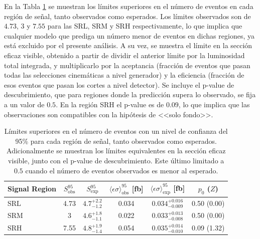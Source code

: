 En la Tabla \ref{tab:model_indep_ul} se muestran los límites superiores en el número de eventos en cada región de señal, tanto observados como esperados. Los límites observados son de $4.73$, $3$ y $7.55$ para las SRL, SRM y SRH respectivamente, lo que implica que cualquier modelo que prediga un número menor de eventos en dichas regiones, ya está excluido por el presente análisis. A su vez, se muestra el límite en la sección eficaz visible, obtenido a partir de dividir el anterior límite por la luminosidad total integrada, y multiplicarlo por la aceptancia (fracción de eventos que pasan todas las selecciones cinemáticas a nivel generador) y la eficiencia (fracción de esos eventos que pasan los cortes a nivel detector). 
Se incluye el p-value de descubrimiento, que para regiones donde la predicción supera lo observado, se fija a un valor de $0.5$. En la región SRH el p-value es de $0.09$, lo que implica que las observaciones son compatibles con la hipótesis de <<solo fondo>>.


\begin{table}[!h]
  \centering
  \caption{Límites superiores en el número de eventos con un nivel de confianza del 95\% para cada región de señal, tanto observados como esperados. Adicionalmente se muestran los límites equivalentes en la sección eficaz visible, junto con el p-value de descubrimiento. Este último limitado a $0.5$ cuando el número de eventos observados es menor al esperado.}

    \begin{tabular}{lccccc}
      \hline
      \hline
      Signal Region  & $S_{\mathrm{obs}}^{95}$  & $S_{\mathrm{exp}}^{95}$ & $\langle\epsilon{\sigma}\rangle_{\mathrm{obs}}^{95}$ [fb]  & $\langle\epsilon{\sigma}\rangle_{\mathrm{exp}}^{95}$ [fb] & $p_{0}$ ($Z$)\\
      \hline
      \hline
      SRL     &   4.73   &   $4.7^{+2.2}_{-1.2}$ &  0.034   &   $0.034^{+0.016}_{-0.009}$    &    0.50 (0.00)  \\ 
      SRM    &   3       &   $4.6^{+1.8}_{-1.1}$ &  0.022   &   $0.033^{+0.013}_{-0.008}$     &    0.50 (0.00)  \\ 
      SRH     &   7.55   &   $4.8^{+1.9}_{-1.4}$ &  0.054   &   $0.035^{+0.014}_{-0.010}$    &    0.09 (1.32)  \\
      \hline
      \hline
    \end{tabular}
    \label{tab:model_indep_ul}
  \end{table}



